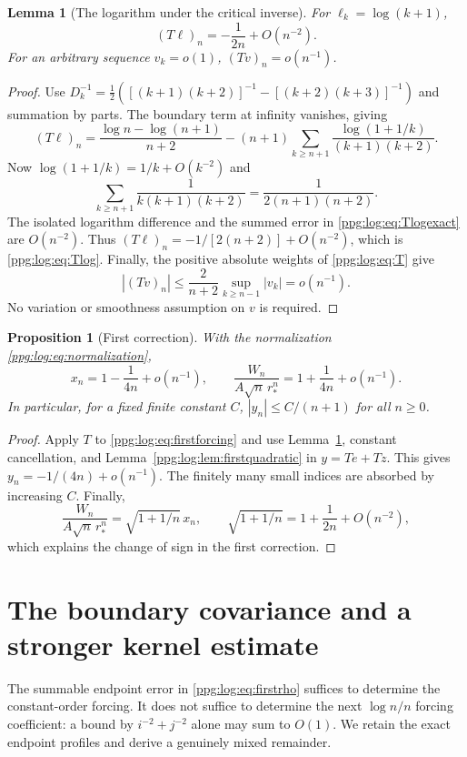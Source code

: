\documentclass[11pt,letterpaper]{article}
\newtheorem{lemma}[theorem]{Lemma}
\newtheorem{proposition}[theorem]{Proposition}
\theoremstyle{remark}\newtheorem{remark}[theorem]{Remark}
\numberwithin{equation}{section}
\begin{document}
\begin{lemma}[The logarithm under the critical inverse]\label{ppg:log:lem:Tlog}
For $\ell_k=\log(k+1)$,
\begin{equation}\label{ppg:log:eq:Tlog}
 (T\ell)_n=-\frac1{2n}+O(n^{-2}).
\end{equation}
For an arbitrary sequence $v_k=o(1)$, $(Tv)_n=o(n^{-1})$.
\end{lemma}
\begin{proof}
Use $D_k^{-1}=\tfrac12([(k+1)(k+2)]^{-1}-[(k+2)(k+3)]^{-1})$ and summation by parts. The boundary term at infinity vanishes, giving
\begin{equation}\label{ppg:log:eq:Tlogexact}
 (T\ell)_n=\frac{\log n-\log(n+1)}{n+2}
 -(n+1)\sum_{k\ge n+1}\frac{\log(1+1/k)}{(k+1)(k+2)}.
\end{equation}
Now $\log(1+1/k)=1/k+O(k^{-2})$ and
\[
 \sum_{k\ge n+1}\frac1{k(k+1)(k+2)}
       =\frac1{2(n+1)(n+2)}.
\]
The isolated logarithm difference and the summed error in \eqref{ppg:log:eq:Tlogexact} are $O(n^{-2})$. Thus $(T\ell)_n=-1/[2(n+2)]+O(n^{-2})$, which is \eqref{ppg:log:eq:Tlog}. Finally, the positive absolute weights of \eqref{ppg:log:eq:T} give
\[
 |(Tv)_n|\le\frac2{n+2}\sup_{k\ge n-1}|v_k|=o(n^{-1}).
\]
No variation or smoothness assumption on $v$ is required.
\end{proof}

\begin{proposition}[First correction]\label{ppg:log:prop:first}
With the normalization \eqref{ppg:log:eq:normalization},
\begin{equation}\label{ppg:log:eq:firstpointwise}
 x_n=1-\frac1{4n}+o(n^{-1}),\qquad
 \frac{W_n}{A\sqrt n\,r_*^n}=1+\frac1{4n}+o(n^{-1}).
\end{equation}
In particular, for a fixed finite constant $C$, $|y_n|\le C/(n+1)$ for all $n\ge0$.
\end{proposition}
\begin{proof}
Apply $T$ to \eqref{ppg:log:eq:firstforcing} and use Lemma~\ref{ppg:log:lem:Tlog}, constant cancellation, and Lemma~\ref{ppg:log:lem:firstquadratic} in $y=Te+Tz$. This gives $y_n=-1/(4n)+o(n^{-1})$. The finitely many small indices are absorbed by increasing $C$. Finally,
\[
 \frac{W_n}{A\sqrt n\,r_*^n}=\sqrt{1+1/n}\,x_n,
 \qquad \sqrt{1+1/n}=1+\frac1{2n}+O(n^{-2}),
\]
which explains the change of sign in the first correction.
\end{proof}

\section{The boundary covariance and a stronger kernel estimate}\label{ppg:log:sec:kernel}
The summable endpoint error in \eqref{ppg:log:eq:firstrho} suffices to determine the constant-order forcing. It does not suffice to determine the next $\log n/n$ forcing coefficient: a bound by $i^{-2}+j^{-2}$ alone may sum to $O(1)$. We retain the exact endpoint profiles and derive a genuinely mixed remainder.
\end{document}
